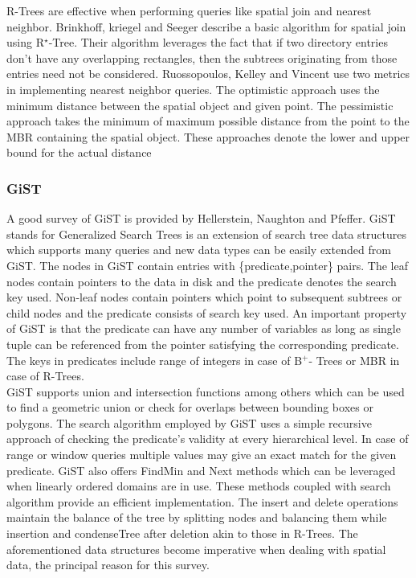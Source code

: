 \documentclass{sig-alternate-05-2015}
\begin{document}
R-Trees are effective when performing queries like spatial join and nearest neighbor. Brinkhoff, kriegel and Seeger \cite{brinkhoff1993efficient} describe a basic algorithm for spatial join using R$^\star$-Tree. Their algorithm leverages the fact that if two directory entries don't have any overlapping rectangles, then the subtrees originating from those entries need not be considered\cite{brinkhoff1993efficient}. Ruossopoulos, Kelley and Vincent \cite{roussopoulos1995nearest} use two metrics in implementing nearest neighbor queries. The optimistic approach uses the minimum distance between the spatial object and given point. The pessimistic approach takes the minimum of maximum possible distance from the point to the MBR containing the spatial object. These approaches denote the lower and upper bound for the actual distance\cite{roussopoulos1995nearest}\\

\subsubsection{GiST}
A good survey of GiST is provided by Hellerstein, Naughton and Pfeffer\cite{hellerstein1995generalized}. GiST stands for Generalized Search Trees is an extension of search tree data structures which supports many queries and new data types can be easily extended from GiST. The nodes in GiST contain entries with \{predicate,pointer\} pairs. The leaf nodes contain pointers to the data in disk and the predicate denotes the search key used. Non-leaf nodes contain pointers which point to subsequent subtrees or child nodes and the predicate consists of search key used. An important property of GiST is that the predicate can have any number of variables as long as single tuple can be referenced from the pointer satisfying the corresponding predicate. The keys in predicates include range of integers in case of B$^+$- Trees or MBR in case of R-Trees.\\

GiST supports union and intersection functions among others which can be used to find a geometric union or check for overlaps between bounding boxes or polygons. The search algorithm employed by GiST uses a simple recursive approach of checking the predicate's validity at every hierarchical level. In case of range or window queries multiple values may give an exact match for the given predicate. GiST also offers FindMin and Next methods which can be leveraged when linearly ordered domains are in use. These methods coupled with search algorithm provide an efficient implementation. The insert and delete operations maintain the balance of the tree by splitting nodes and balancing them while insertion and condenseTree after deletion akin to those in R-Trees\cite{hellerstein1995generalized}.
The aforementioned data structures become imperative when dealing with spatial data, the principal reason for this survey.
\end{document}
